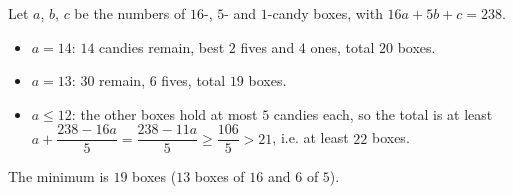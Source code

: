 Let $a$, $b$, $c$ be the numbers of $16$-, $5$- and $1$-candy boxes, with $16a+5b+c=238$.
\begin{itemize}
\item $a=14$: $14$ candies remain, best $2$ fives and $4$ ones, total $20$ boxes.
\item $a=13$: $30$ remain, $6$ fives, total $19$ boxes.
\item $a\le12$: the other boxes hold at most $5$ candies each, so the total is at least $a+\dfrac{238-16a}{5}=\dfrac{238-11a}{5}\ge\dfrac{106}{5}>21$, i.e. at least $22$ boxes.
\end{itemize}
The minimum is $\boxed{19}$ boxes ($13$ boxes of $16$ and $6$ of $5$).
